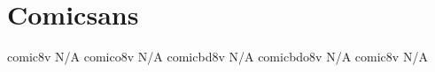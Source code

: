 \documentclass[sample]{vnsample}
\begin{document}
\section{Comicsans}
  {comic8v}    {N/A}
 {comico8v}   {N/A}
  {comicbd8v}  {N/A}
 {comicbdo8v} {N/A}
  {comic8v}    {N/A}
\end{document}
